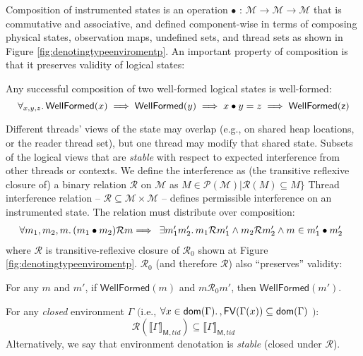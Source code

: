 Composition of instrumented states is an operation $\bullet$ : $\mathcal{M} \longrightarrow \mathcal{M} \longrightarrow \mathcal{M}$ that is commutative and associative, and defined component-wise in terms of composing physical states, observation maps, undefined sets, and thread sets as shown in Figure \ref{fig:denotingtypeenviromentp}. An important property of composition is that it preserves validity of logical states:
\begin{lemma}
\label{lem:wf-compositionp}
Any successful composition of two well-formed logical states is well-formed:\[\forall_{x,y,z}\ldotp \mathsf{WellFormed}(x) \implies \mathsf{WellFormed}(y) \implies x\bullet y = z \implies \mathsf{WellFormed(z)}\]
\end{lemma}
Different threads' views of the state may overlap (e.g., on shared heap locations, or the reader thread set), but one thread may modify that shared state. Subsets of the logical views that are \emph{stable} with respect to expected interference from other threads or contexts.  We define the interference as (the transitive reflexive closure of) a binary relation $\mathcal{R}$ on $\mathcal{M}$ as $M \in \mathcal{P}(\mathcal{M}) | \mathcal{R}(M) \subseteq M\}$
Thread interference relation -- $\mathcal{R} \subseteq \mathcal{M} \times \mathcal{M}$ --  defines permissible interference on an instrumented state. The relation must distribute over composition:
\[ \forall m_{1}, m_{2}, m\ldotp (m_{1} \bullet  m_{2})\mathcal{R}m \Longrightarrow \begin{array}{ll}  \exists  m'_{1} m'_{2} \ldotp m_{1} \mathcal{R} m'_{1} \land m_{2} \mathcal{R} m'_{2} \land  m \in m'_{1} \bullet m'_{2} \end{array}\]
where $\mathcal{R}$ is transitive-reflexive closure of $\mathcal{R}_{0}$ shown at Figure \ref{fig:denotingtypeenviromentp}. $\mathcal{R}_0$ (and therefore $\mathcal{R}$) also ``preserves'' validity:
\begin{lemma}
For any $m$ and $m'$, if $\mathsf{WellFormed}(m)$ and $m\mathcal{R}_0m'$, then $\mathsf{WellFormed}(m')$.
\end{lemma}
\begin{lemma}
For any \emph{closed} environment $\Gamma$ $($i.e., $\forall x\in\mathsf{dom}(\Gamma)\ldotp, \mathsf{FV}(\Gamma(x))\subseteq\mathsf{dom}(\Gamma)$ $):$
\[
\mathcal{R}(\llbracket\Gamma\rrbracket_{\mathsf{M},tid})\subseteq\llbracket\Gamma\rrbracket_{\mathsf{M},tid}
\]
Alternatively, we say that environment denotation is \emph{stable} (closed under $\mathcal{R}$).
\end{lemma}
